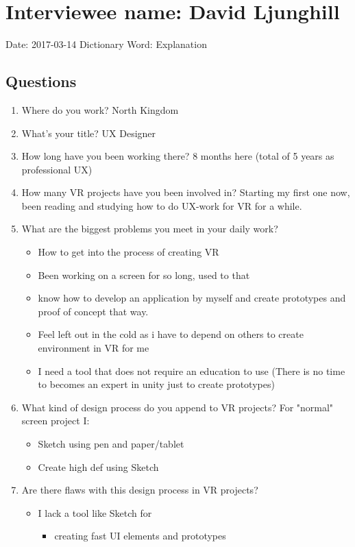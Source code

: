 \section{Interviewee name: David Ljunghill}
Date: 2017-03-14
Dictionary
Word: Explanation
\subsection{Questions}
\begin{enumerate}
\item Where do you work?
North Kingdom
\item What's your title?
UX Designer
\item How long have you been working there?
8 months here (total of 5 years as professional UX)
\item How many VR projects have you been involved in?
Starting my first one now, been reading and studying how to do UX-work for VR for a while.
\item What are the biggest problems you meet in your daily work?
\begin{itemize}
  \item How to get into the process of creating VR
  \item Been working on a screen for so long, used to that
  \item know how to develop an application by myself and create prototypes and proof of concept that way.
  \item Feel left out in the cold as i have to depend on others to create environment in VR for me
  \item I need a tool that does not require an education to use (There is no time to becomes an expert in unity just to create prototypes)
\end{itemize}
\item What kind of design process do you append to VR projects?
For "normal" screen project I:
\begin{itemize}
  \item Sketch using pen and paper/tablet
  \item Create high def using Sketch
\end{itemize}
\item Are there flaws with this design process in VR projects?
\begin{itemize}
\item I lack a tool like Sketch for
\begin{itemize}
  \item creating fast UI elements and prototypes

\end{itemize}
\end{itemize}
\end{enumerate}
